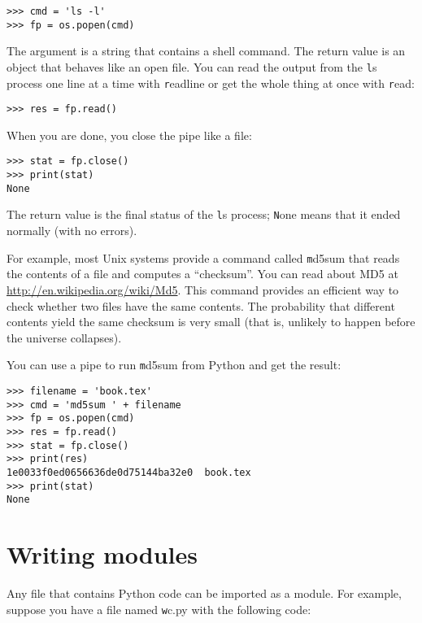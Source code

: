 \documentclass[
DIV=11,
fontsize=13,
twoside,
headinclude=false,
titlepage=firstiscover,
abstract=true,
headsepline=true,
footsepline=true,
chapterprefix=true, %
headings=big,
bibliography=totoc,%
captions=tableheading
]{scrbook}
\theoremstyle{definition}
\begin{document}
\begin{lstlisting}
>>> cmd = 'ls -l'
>>> fp = os.popen(cmd)
\end{lstlisting}
%
The argument is a string that contains a shell command.  The
return value is an object that behaves like an open
file.  You can read the output from the {\texttt ls} process one
line at a time with {\texttt readline} or get the whole thing at
once with {\texttt read}:

\begin{lstlisting}
>>> res = fp.read()
\end{lstlisting}
%
When you are done, you close the pipe like a file:

\begin{lstlisting}
>>> stat = fp.close()
>>> print(stat)
None
\end{lstlisting}
%
The return value is the final status of the {\texttt ls} process;
{\texttt None} means that it ended normally (with no errors).

For example, most Unix systems provide a command called {\texttt md5sum}
that reads the contents of a file and computes a ``checksum''.
You can read about MD5 at \url{http://en.wikipedia.org/wiki/Md5}.  This
command provides an efficient way to check whether two files
have the same contents.  The probability that different contents
yield the same checksum is very small (that is, unlikely to happen
before the universe collapses).

You can use a pipe to run {\texttt md5sum} from Python and get the result:

\begin{lstlisting}
>>> filename = 'book.tex'
>>> cmd = 'md5sum ' + filename
>>> fp = os.popen(cmd)
>>> res = fp.read()
>>> stat = fp.close()
>>> print(res)
1e0033f0ed0656636de0d75144ba32e0  book.tex
>>> print(stat)
None
\end{lstlisting}



\section{Writing modules}
\label{modules}

Any file that contains Python code can be imported as a module.
For example, suppose you have a file named {\texttt wc.py} with the following
code:
\end{document}
